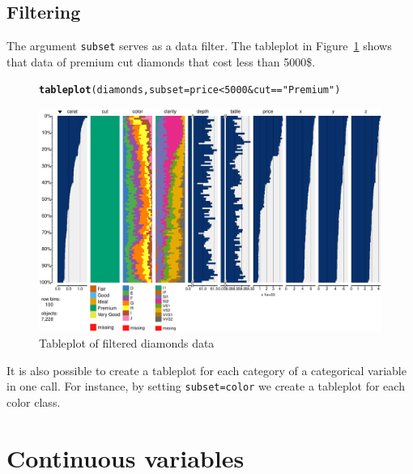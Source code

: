 \documentclass[11pt, fleqn, a4paper]{article}\usepackage[]{graphicx}\usepackage[]{color}
\makeatletter
\def\maxwidth{ %
  \ifdim\Gin@nat@width>\linewidth
    \linewidth
  \else
    \Gin@nat@width
  \fi
}
\newcommand{\hlnum}[1]{\textcolor[rgb]{0.686,0.059,0.569}{#1}}%
\newcommand{\hlstr}[1]{\textcolor[rgb]{0.192,0.494,0.8}{#1}}%
\newcommand{\hlopt}[1]{\textcolor[rgb]{0,0,0}{#1}}%
\newcommand{\hlstd}[1]{\textcolor[rgb]{0.345,0.345,0.345}{#1}}%
\newcommand{\hlkwc}[1]{\textcolor[rgb]{0.333,0.667,0.333}{#1}}%
\newcommand{\hlkwd}[1]{\textcolor[rgb]{0.737,0.353,0.396}{\textbf{#1}}}%
\newenvironment{kframe}{%
 \def\at@end@of@kframe{}%
 \ifinner\ifhmode%
  \def\at@end@of@kframe{\end{minipage}}%
  \begin{minipage}{\columnwidth}%
 \fi\fi%
 \def\FrameCommand##1{\hskip\@totalleftmargin \hskip-\fboxsep
 \colorbox{shadecolor}{##1}\hskip-\fboxsep
     \hskip-\linewidth \hskip-\@totalleftmargin \hskip\columnwidth}%
 \MakeFramed {\advance\hsize-\width
   \@totalleftmargin\z@ \linewidth\hsize
   \@setminipage}}%
 {\par\unskip\endMakeFramed%
 \at@end@of@kframe}
\newenvironment{knitrout}{}{} %
\makeatother
\begin{document}
\subsection{Filtering}\label{secfilt}
The argument {\tt subset} serves as a data filter. The tableplot in Figure~\ref{fig:tp4} shows that data of premium cut diamonds that cost less than 5000\$.

\begin{figure}[!htp]
\begin{knitrout}
\color{fgcolor}\begin{kframe}
\begin{alltt}
\hlkwd{tableplot}\hlstd{(diamonds,} \hlkwc{subset} \hlstd{= price} \hlopt{<} \hlnum{5000} \hlopt{&} \hlstd{cut} \hlopt{==} \hlstr{"Premium"}\hlstd{)}
\end{alltt}
\end{kframe}
\includegraphics[width=\maxwidth]{figure/chunk5} 

\end{knitrout}

\caption{Tableplot of filtered diamonds data}
\label{fig:tp4}
\end{figure}

It is also possible to create a tableplot for each category of a categorical variable in one call. For instance, by setting {\tt subset=color} we create a tableplot for each color class.

\clearpage

\section{Continuous variables}
\end{document}

